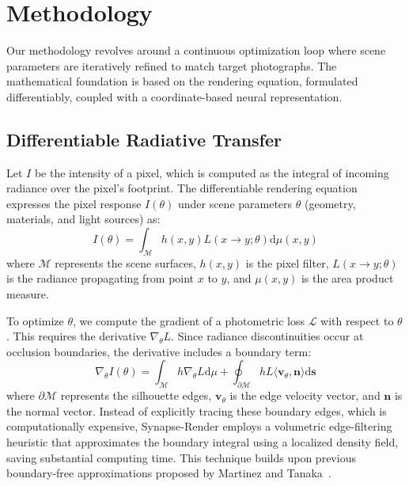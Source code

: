 \section{Methodology}
Our methodology revolves around a continuous optimization loop where scene parameters are iteratively refined to match target photographs. The mathematical foundation is based on the rendering equation, formulated differentiably, coupled with a coordinate-based neural representation.

\subsection{Differentiable Radiative Transfer}
Let $I$ be the intensity of a pixel, which is computed as the integral of incoming radiance over the pixel's footprint. The differentiable rendering equation expresses the pixel response $I(\theta)$ under scene parameters $\theta$ (geometry, materials, and light sources) as:
\begin{equation}
    I(\theta) = \int_{\mathcal{M}} h(x, y) L(x \rightarrow y; \theta) \mathrm{d}\mu(x, y)
\end{equation}
where $\mathcal{M}$ represents the scene surfaces, $h(x, y)$ is the pixel filter, $L(x \rightarrow y; \theta)$ is the radiance propagating from point $x$ to $y$, and $\mu(x, y)$ is the area product measure.

To optimize $\theta$, we compute the gradient of a photometric loss $\mathcal{L}$ with respect to $\theta$. This requires the derivative $\nabla_\theta L$. Since radiance discontinuities occur at occlusion boundaries, the derivative includes a boundary term:
\begin{equation}
    \nabla_\theta I(\theta) = \int_{\mathcal{M}} h \nabla_\theta L \mathrm{d}\mu + \oint_{\partial\mathcal{M}} h L \langle \mathbf{v}_\theta, \mathbf{n} \rangle \mathrm{d}\mathbf{s}
\end{equation}
where $\partial\mathcal{M}$ represents the silhouette edges, $\mathbf{v}_\theta$ is the edge velocity vector, and $\mathbf{n}$ is the normal vector. Instead of explicitly tracing these boundary edges, which is computationally expensive, Synapse-Render employs a volumetric edge-filtering heuristic that approximates the boundary integral using a localized density field, saving substantial computing time. This technique builds upon previous boundary-free approximations proposed by Martinez and Tanaka~\cite{meridian2023differentiable}.

